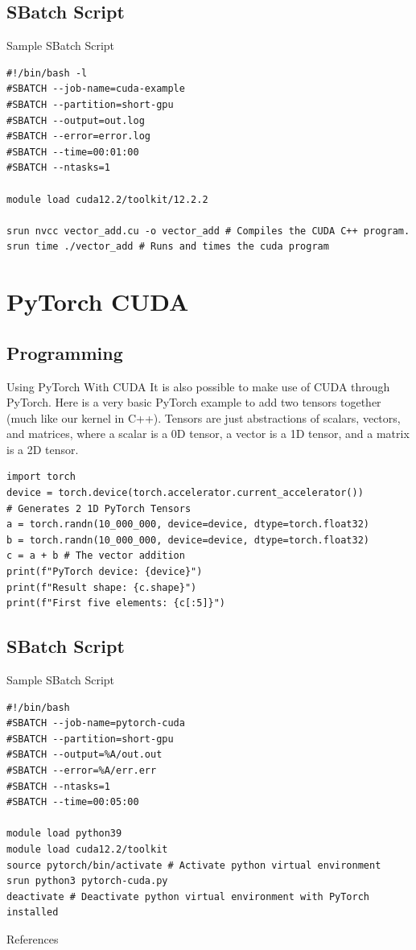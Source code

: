 \documentclass[aspectratio=169]{beamer}
\begin{document}
\subsection{SBatch Script}
\begin{frame}[fragile]{Sample SBatch Script}
	\begin{verbatim}
#!/bin/bash -l
#SBATCH --job-name=cuda-example
#SBATCH --partition=short-gpu
#SBATCH --output=out.log
#SBATCH --error=error.log
#SBATCH --time=00:01:00
#SBATCH --ntasks=1

module load cuda12.2/toolkit/12.2.2

srun nvcc vector_add.cu -o vector_add # Compiles the CUDA C++ program.
srun time ./vector_add # Runs and times the cuda program
	\end{verbatim}
\end{frame}

\section{PyTorch CUDA}
\subsection{Programming}
\begin{frame}[fragile]{Using PyTorch With CUDA}
	It is also possible to make use of CUDA through PyTorch. Here is a very basic PyTorch example to add two tensors together (much like our kernel in C++). Tensors are just abstractions of scalars, vectors, and matrices, where a scalar is a 0D tensor, a vector is a 1D tensor, and a matrix is a 2D tensor.

	\begin{verbatim}
import torch
device = torch.device(torch.accelerator.current_accelerator())
# Generates 2 1D PyTorch Tensors
a = torch.randn(10_000_000, device=device, dtype=torch.float32)
b = torch.randn(10_000_000, device=device, dtype=torch.float32)
c = a + b # The vector addition
print(f"PyTorch device: {device}")
print(f"Result shape: {c.shape}")
print(f"First five elements: {c[:5]}")
	\end{verbatim}
\end{frame}

\subsection{SBatch Script}

\begin{frame}[fragile]{Sample SBatch Script}
	\begin{verbatim}
#!/bin/bash
#SBATCH --job-name=pytorch-cuda
#SBATCH --partition=short-gpu
#SBATCH --output=%A/out.out
#SBATCH --error=%A/err.err
#SBATCH --ntasks=1
#SBATCH --time=00:05:00

module load python39
module load cuda12.2/toolkit
source pytorch/bin/activate # Activate python virtual environment 
srun python3 pytorch-cuda.py
deactivate # Deactivate python virtual environment with PyTorch installed
	\end{verbatim}
\end{frame}

\begin{frame}{References}
	\printbibliography[heading=bibintoc]
\end{frame}
\end{document}
